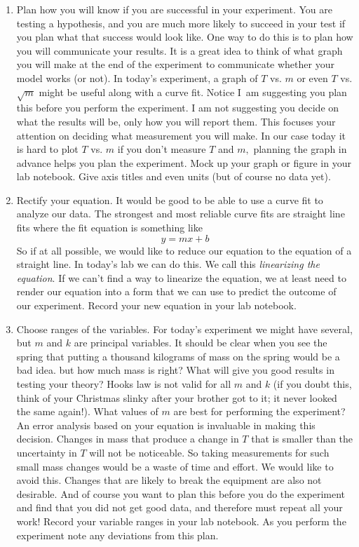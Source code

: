 \documentclass{book}
\begin{document}
\begin{enumerate}
\item Plan how you will know if you are successful in your experiment. You are
testing a hypothesis, and you are much more likely to succeed in your test if
you plan what that success would look like. One way to do this is to plan how
you will communicate your results. It is a great idea to think of what graph
you will make at the end of the experiment to communicate whether your model
works (or not). In today's experiment, a graph of $T$ vs. $m$ or even $T$
vs.$\sqrt{m}$ might be useful along with a curve fit. Notice I\ am suggesting
you plan this before you perform the experiment. I am not suggesting you
decide on what the results will be, only how you will report them. This
focuses your attention on deciding what measurement you will make. In our case
today it is hard to plot $T$ vs. $m$ if you don't measure $T$ and $m,$
planning the graph in advance helps you plan the experiment. Mock up your
graph or figure in your lab notebook. Give axis titles and even units (but of
course no data yet).

\item Rectify your equation. It would be good to be able to use a curve fit to
analyze our data. The strongest and most reliable curve fits are straight line
fits where the fit equation is something like
\[
y=mx+b
\]
So if at all possible, we would like to reduce our equation to the equation of
a straight line. In today's lab we can do this. We call this \emph{linearizing
the equation}. If we can't find a way to linearize the equation, we at least
need to render our equation into a form that we can use to predict the outcome
of our experiment. Record your new equation in your lab notebook.

\item Choose ranges of the variables. For today's experiment we might have
several, but $m$ and $k$ are principal variables. It should be clear when you
see the spring that putting a thousand kilograms of mass on the spring would
be a bad idea. but how much mass is right? What will give you good results in
testing your theory? Hooks law is not valid for all $m$ and $k$ (if you doubt
this, think of your Christmas slinky after your brother got to it; it never
looked the same again!). What values of $m$ are best for performing the
experiment? An error analysis based on your equation is invaluable in making
this decision. Changes in mass that produce a change in $T$ that is smaller
than the uncertainty in $T$ will not be noticeable. So taking measurements for
such small mass changes would be a waste of time and effort. We would like to
avoid this. Changes that are likely to break the equipment are also not
desirable. And of course you want to plan this before you do the experiment
and find that you did not get good data, and therefore must repeat all your
work! Record your variable ranges in your lab notebook. As you perform the
experiment note any deviations from this plan.


\end{enumerate}
\end{document}
